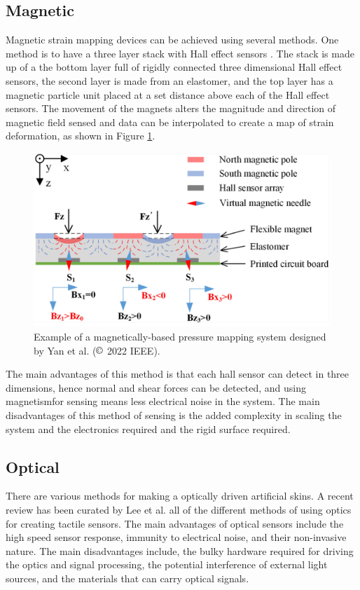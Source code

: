 \subsection{Magnetic}
Magnetic strain mapping devices can be achieved using several methods. One method is to have a three layer stack with Hall effect sensors \cite{Yan2021,Yan2022}. The stack is made up of a the bottom layer full of rigidly connected three dimensional Hall effect sensors, the second layer is made from an elastomer, and the top layer has a magnetic particle unit placed at a set distance above each of the Hall effect sensors. The movement of the magnets alters the magnitude and direction of magnetic field sensed and data can be interpolated to create a map of strain deformation, as shown in Figure \ref{fig:mag_pressure_map_sensor}. 
\begin{figure}[H]
	\centering
	\includegraphics[width=0.6\linewidth]{Figures/mag_pressure_mapping.png}
	\caption{Example of a magnetically-based pressure mapping system designed by Yan et al. \cite{Yan2022} ($\copyright$ 2022 IEEE).}
	\label{fig:mag_pressure_map_sensor}
\end{figure}
The main advantages of this method is that each hall sensor can detect in three dimensions, hence normal and shear forces can be detected, and using magnetismfor sensing means less electrical noise in the system. The main disadvantages of this method of sensing is the added complexity in scaling the system and the electronics required and the rigid surface required.  

\subsection{Optical}
There are various methods for making a optically driven artificial skins. A recent review has been curated by Lee et al. \cite{Lee2023} all of the different methods of using optics for creating tactile sensors. The main advantages of optical sensors include the high speed sensor response, immunity to electrical noise, and their non-invasive nature. The main disadvantages include, the bulky hardware required for driving the optics and signal processing, the potential interference of external light sources, and the materials that can carry optical signals. 



